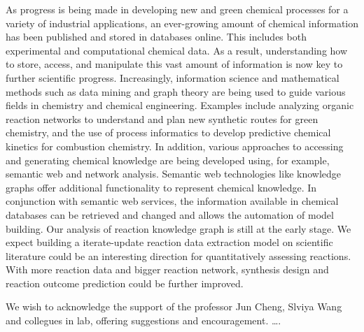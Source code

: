 \documentclass[%
 aip,
 jmp,%
 amsmath,amssymb,
 reprint,%
]{revtex4-2}
\begin{document}
As progress is being made in developing new and green chemical processes for a variety of
industrial applications, an ever-growing amount of chemical information has been 
published and stored in databases online. This includes both experimental and 
computational chemical data. As a result, understanding how to store, access, 
and manipulate this vast amount of information is now key to further scientific 
progress. Increasingly, information science and mathematical methods such as data 
mining and graph theory are being used to guide various fields in chemistry and chemical 
engineering. Examples include analyzing organic reaction networks to understand and 
plan new synthetic routes for green chemistry, and the use of process 
informatics to develop predictive chemical kinetics for combustion chemistry. 
In addition, various approaches to accessing and generating chemical knowledge are
being developed using, for example, semantic web and network analysis.
Semantic web technologies like knowledge graphs offer additional functionality to
represent chemical knowledge. In conjunction with semantic web services, the information 
available in chemical databases can be retrieved and changed and 
allows the automation of model building. Our analysis of reaction knowledge graph is still at the early 
stage. We expect building a iterate-update reaction data extraction model on scientific literature could be 
an interesting direction for quantitatively assessing reactions. With more reaction data
and bigger reaction network, synthesis design and reaction outcome prediction could be 
further improved.

\begin{acknowledgments}
We wish to acknowledge the support of the professor Jun Cheng, Slviya Wang and collegues in lab, 
offering suggestions and encouragement.
\dots.
\end{acknowledgments}

\nocite{*}
\end{document}

